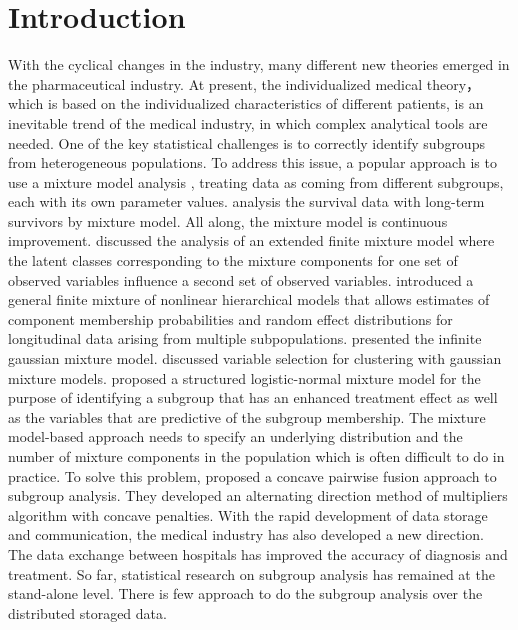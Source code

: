 \documentclass[review]{elsarticle}
\begin{document}
\section{Introduction}
 With the cyclical changes in the industry, many different new theories emerged in the pharmaceutical industry. At present, the individualized medical theory，which is based on the individualized characteristics of different patients, is an inevitable trend of the medical industry, in which complex analytical tools are needed. One of the key statistical challenges is to correctly identify subgroups from heterogeneous populations. To address this issue, a popular approach is to use a mixture model analysis \cite{everitt1981finite}, treating data as coming from different subgroups, each with its own parameter values. \cite{farewell1982use} analysis the survival data with long-term survivors by mixture model. All along, the mixture model is continuous improvement. \cite{muthen1999finite} discussed the analysis of an extended finite mixture model where the latent classes corresponding to the mixture components for one set of observed variables influence a second set of observed variables. \cite{pauler2000mixture} introduced a general finite mixture of nonlinear hierarchical models that allows estimates of component membership probabilities and random effect distributions for longitudinal data arising from multiple subpopulations. \cite{rasmussen2000infinite} presented the infinite gaussian mixture model. \cite{maugis2009variable} discussed variable selection for clustering with gaussian mixture models. \cite{shen2015inference} proposed a structured logistic-normal mixture model for the purpose of identifying a subgroup that has an enhanced treatment effect as well as the variables that are predictive of the subgroup membership. The mixture model-based approach needs to specify an underlying distribution and the number of mixture components in the population which is often difficult to do in practice. To solve this problem, \cite{ma2017concave} proposed a concave pairwise fusion approach to subgroup analysis. They developed an alternating direction method of multipliers algorithm with concave penalties. With the rapid development of data storage and communication, the medical industry has also developed a new direction. The data exchange between hospitals has improved the accuracy of diagnosis and treatment. So far, statistical research on subgroup analysis has remained at the stand-alone level. There is few approach to do the subgroup analysis over the distributed storaged data.
\end{document}
